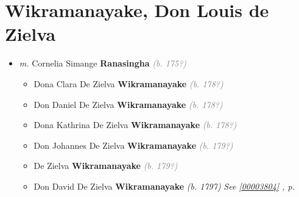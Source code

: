 \documentclass[10pt, openany]{book}
\begin{document}
\chapter{Wikramanayake, Don Louis de Zielva}
\label{00003797}
\textcolor{slmaroon}{\textit{}}
\begin{itemize}
\item{\textit{m.} Cornelia Simange \textbf{Ranasingha} \textcolor{gray}{\textit{(b. 175?)}}   \label{couple:00003797:00003798} \begin{itemize}
\item{Dona Clara De Zielva \textbf{Wikramanayake} \textcolor{gray}{\textit{(b. 178?)}}
    }
\item{Don Daniel De Zielva \textbf{Wikramanayake} \textcolor{gray}{\textit{(b. 178?)}}
    }
\item{Dona Kathrina De Zielva \textbf{Wikramanayake} \textcolor{gray}{\textit{(b. 178?)}}
    }
\item{Don Johannes De Zielva \textbf{Wikramanayake} \textcolor{gray}{\textit{(b. 179?)}}
    }
\item{De Zielva \textbf{Wikramanayake} \textcolor{gray}{\textit{(b. 179?)}}
  }
\item{Don David De Zielva \textbf{Wikramanayake} \textcolor{slorange}{\textit{(b. 1797)}} \textcolor{slteal}{\textit{See  \autoref{00003804} \textit{, p. \pageref{00003804} }}}}
\end{itemize}}
\end{itemize}
    
\end{document}
